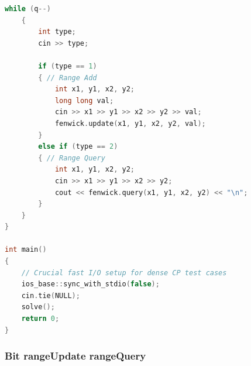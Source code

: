\documentclass[10pt,landscape,a4paper,twocolumn]{article}
\begin{document}
\begin{lstlisting}[language=C++]
    while (q--)
    {
        int type;
        cin >> type;

        if (type == 1)
        { // Range Add
            int x1, y1, x2, y2;
            long long val;
            cin >> x1 >> y1 >> x2 >> y2 >> val;
            fenwick.update(x1, y1, x2, y2, val);
        }
        else if (type == 2)
        { // Range Query
            int x1, y1, x2, y2;
            cin >> x1 >> y1 >> x2 >> y2;
            cout << fenwick.query(x1, y1, x2, y2) << "\n";
        }
    }
}

int main()
{
    // Crucial fast I/O setup for dense CP test cases
    ios_base::sync_with_stdio(false);
    cin.tie(NULL);
    solve();
    return 0;
}
\end{lstlisting}
\subsubsection{Bit rangeUpdate rangeQuery}
\end{document}
